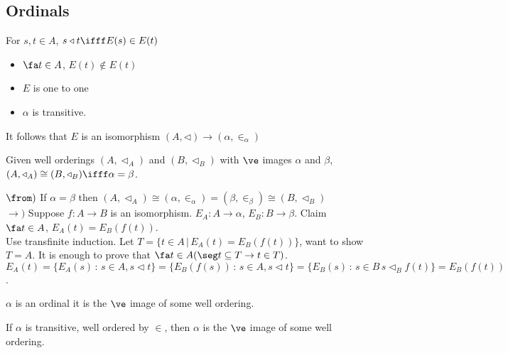 
\subsection{Ordinals}

\begin{theorem}
    For $s, t \in A$, $s \triangleleft t \ifff E(s) \in E(t)$ 
\end{theorem}

\begin{theorem}
    \begin{itemize}
        \item $\fa t \in A$, $E(t) \not\in E(t)$ 
        \item $E$ is one to one 
        \item $\alpha$ is transitive. 
    \end{itemize}
\end{theorem}

\noindent
It follows that $E$ is an isomorphism $(A, \triangleleft) \to (\alpha, \in_{\alpha})$ 

\begin{theorem}
    Given well orderings $(A, \triangleleft_A)$ and $(B, \triangleleft_B)$ with $\ve$ images $\alpha$ and $\beta$, $(A, \triangleleft_A) \cong (B, \triangleleft_B) \ifff \alpha = \beta$. 
\end{theorem}

\begin{pf}
    $\from)$ If $\alpha = \beta$ then $(A, \triangleleft_A) \cong (\alpha, \in_{\alpha}) = (\beta, \in_{\beta}) \cong (B, \triangleleft_B)$ \\
    $\to)$ Suppose $f:A \to B$ is an isomorphism. $E_A: A \to \alpha$, $E_B: B \to \beta$. Claim $\fa t\in A$, $E_A(t) = E_B(f(t))$. \\
    Use transfinite induction. Let $T = \{t \in A \, | \, E_A(t) = E_B(f(t))\}$, want to show $T = A$. It is enough to prove that $\fa t \in A (\seg t \subseteq T \to t \in T )$. $E_A(t) = \{E_A(s) \, : \, s \in A, s\triangleleft t\} = \{E_B(f(s)) \, : \, s \in A, s\triangleleft t\} = \{E_B(s) \, : \, s \in B \, s \triangleleft_B f(t) \} = E_B(f(t))$. 
\end{pf}

\begin{definition}
    $\alpha$ is an ordinal it is the $\ve$ image of some well ordering. 
\end{definition}

\begin{theorem}
    If $\alpha$ is transitive, well ordered by $\in$, then $\alpha$ is the $\ve$ image of some well ordering. 
\end{theorem}


